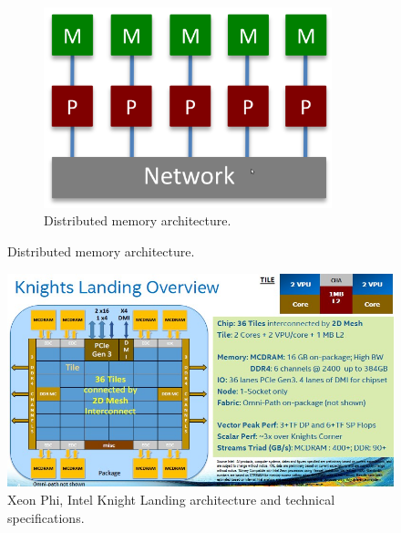 \begin{description}
\begin{figure}
\begin{subfigure}{0.55\textwidth}
 	\end{subfigure}%
 	\begin{subfigure}{0.45\textwidth}
 		\centering
 		\caption{Distributed memory architecture.}
 		\label{fig:distribuiteMemory}
 		\includegraphics[width=0.92\textwidth]{./images/parallel_programming/distribuitedMemory}
 	\end{subfigure}%
 \end{figure}

\begin{figure}
	\centering
	\includegraphics[width=1.0\textwidth]{./images/parallel_programming/xeonphi}
	\caption{Xeon Phi, Intel Knight Landing architecture and technical specifications.}
	\label{fig:intelPhi}
\end{figure}




\end{description}
